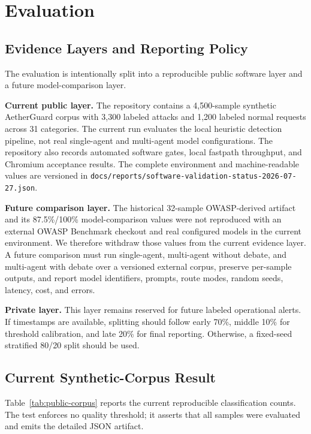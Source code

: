 \section{Evaluation}\label{sec:evaluation}

\subsection{Evidence Layers and Reporting Policy}

The evaluation is intentionally split into a reproducible public software layer and a future model-comparison layer.

\textbf{Current public layer.} The repository contains a 4,500-sample synthetic AetherGuard corpus with 3,300 labeled attacks and 1,200 labeled normal requests across 31 categories. The current run evaluates the local heuristic detection pipeline, not real single-agent and multi-agent model configurations. The repository also records automated software gates, local fastpath throughput, and Chromium acceptance results. The complete environment and machine-readable values are versioned in \nolinkurl{docs/reports/software-validation-status-2026-07-27.json}.

\textbf{Future comparison layer.} The historical 32-sample OWASP-derived artifact and its 87.5\%/100\% model-comparison values were not reproduced with an external OWASP Benchmark checkout and real configured models in the current environment. We therefore withdraw those values from the current evidence layer. A future comparison must run single-agent, multi-agent without debate, and multi-agent with debate over a versioned external corpus, preserve per-sample outputs, and report model identifiers, prompts, route modes, random seeds, latency, cost, and errors.

\textbf{Private layer.} This layer remains reserved for future labeled operational alerts. If timestamps are available, splitting should follow early 70\%, middle 10\% for threshold calibration, and late 20\% for final reporting. Otherwise, a fixed-seed stratified 80/20 split should be used.

\subsection{Current Synthetic-Corpus Result}

Table~\ref{tab:public-corpus} reports the current reproducible classification counts. The test enforces no quality threshold; it asserts that all samples were evaluated and emits the detailed JSON artifact.

